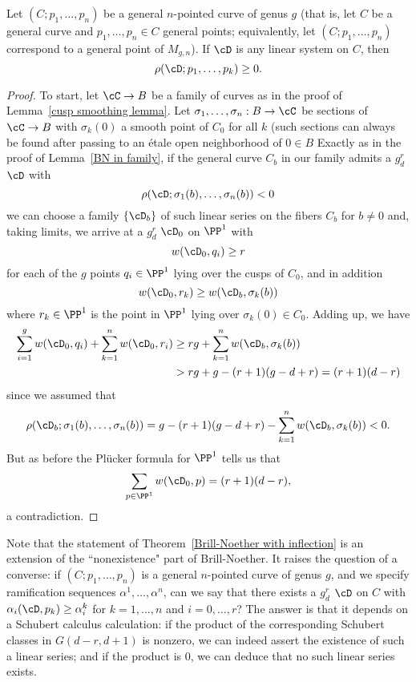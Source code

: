 
\begin{theorem}\label{Brill-Noether with inflection}
Let $(C;p_1,\dots,p_n)$ be a general $n$-pointed curve of genus $g$ (that is, let $C$ be a general curve and $p_1,\dots,p_n \in C$ general points; equivalently, let $(C;p_1,\dots,p_n)$ correspond to a general point of $M_{g,n}$). If $\cD$ is any linear system on $C$, then
$$
\rho(\cD; p_1,\dots,p_k) \geq 0.
$$
\end{theorem}

\begin{proof}
To start, let $\cC \to B$ be a family of curves as in the proof of Lemma~\ref{cusp smoothing lemma}. Let $\sigma_1, \dots, \sigma_n : B \to \cC$ be sections of $\cC \to B$ with $\sigma_k(0)$ a smooth point of $C_0$ for all $k$ (such sections can always be found after passing to an \'etale open neighborhood of $0 \in B$ 
Exactly as in the proof of Lemma~\ref{BN in family}, if the general curve $C_b$ in our family admits a $g^r_d$ $\cD$ with
$$
\rho(\cD;\sigma_1(b),\dots,\sigma_n(b)) < 0
$$
we can choose a family $\{\cD_b\}$ of such linear series 
on the fibers $C_b$ for $b \neq 0$ and, taking limits, we arrive at a $g^r_d$ $\cD_0$ on $\PP^1$ with
$$
w(\cD_0, q_i) \geq r
$$
for each of the $g$ points $q_i \in \PP^1$ lying over the cusps of $C_0$, and in addition
$$
w(\cD_0, r_k) \geq w(\cD_b,\sigma_k(b))
$$
where $r_k \in \PP^1$ is the point in $\PP^1$ lying over $\sigma_k(0) \in C_0$. Adding up, we have
\begin{align*}
\sum_{i=1}^g w(\cD_0, q_i) + \sum_{k=1}^n w(\cD_0, r_i) &\geq rg + \sum_{k=1}^n w(\cD_b,\sigma_k(b)) \\
&> rg + g - (r+1)(g-d+r) = (r+1)(d-r)
\end{align*}
since we assumed that 
$$
\rho(\cD_b;\sigma_1(b),\dots,\sigma_n(b)) = g - (r+1)(g-d+r) - \sum_{k=1}^n w(\cD_b,\sigma_k(b)) < 0.
$$
But as before the Pl\"ucker formula for $\PP^1$ tells us that
$$
\sum_{p \in \PP^1} w(\cD_0, p) = (r+1)(d-r),
$$
a contradiction.
\end{proof}

Note that the statement of Theorem~\ref{Brill-Noether with inflection} is an extension of the ``nonexistence" part of Brill-Noether. It raises the question of a converse: if $(C;p_1,\dots,p_n)$ is a general $n$-pointed curve of genus $g$, and we specify ramification sequences $\alpha^1, \dots, \alpha^n$, can we say that there exists a $g^r_d$ $\cD$ on $C$ with $\alpha_i(\cD, p_k) \geq \alpha^k_i$ for $k=1,\dots,n$ and $i = 0, \dots, r$? The answer is that it depends on a Schubert calculus calculation: if the product of the corresponding Schubert classes in $G(d-r, d+1)$ is nonzero, we can indeed assert the existence of such a linear series; and if the product is 0, we can deduce that no such linear series exists.


